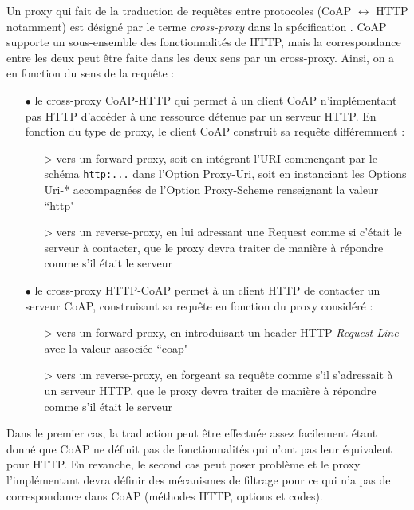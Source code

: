 \documentclass[]{report}
\begin{document}
\par Un proxy qui fait de la traduction de requêtes entre protocoles (CoAP $\leftrightarrow$ HTTP notamment) est désigné par le terme \textit{cross-proxy} dans la spécification \cite{rfc7252}. CoAP supporte un sous-ensemble des fonctionnalités de HTTP, mais la correspondance entre les deux peut être faite dans les deux sens par un cross-proxy. Ainsi, on a en fonction du sens de la requête :
\vspace{0.2cm}
\begin{itemize}
\item[$\bullet$] le cross-proxy CoAP-HTTP qui permet à un client CoAP n'implémentant pas HTTP d'accéder à une ressource détenue par un serveur HTTP. En fonction du type de proxy, le client CoAP construit sa requête différemment :
	\begin{itemize}
	\item[$\triangleright$] vers un forward-proxy, soit en intégrant l'URI commençant par le schéma \texttt{http:...} dans l'Option Proxy-Uri, soit en instanciant les Options Uri-* accompagnées de l'Option Proxy-Scheme renseignant la valeur ``http"
	\item[$\triangleright$] vers un reverse-proxy, en lui adressant une Request comme si c'était le serveur à contacter, que le proxy devra traiter de manière à répondre comme s'il était le serveur	
	\end{itemize}	 
\vspace{0.1cm}
\item[$\bullet$] le cross-proxy HTTP-CoAP permet à un client HTTP de contacter un serveur CoAP, construisant sa requête en fonction du proxy considéré :
	\begin{itemize}
	\item[$\triangleright$] vers un forward-proxy, en introduisant un header HTTP \textit{Request-Line} avec la valeur associée ``coap"
	\item[$\triangleright$] vers un reverse-proxy, en forgeant sa requête comme s'il s'adressait à un serveur HTTP, que le proxy devra traiter de manière à répondre comme s'il était le serveur
	\end{itemize}	 

\end{itemize}

\par Dans le premier cas, la traduction peut être effectuée assez facilement étant donné que CoAP ne définit pas de fonctionnalités qui n'ont pas leur équivalent pour HTTP. En revanche, le second cas peut poser problème et le proxy l'implémentant devra définir des mécanismes de filtrage pour ce qui n'a pas de correspondance dans CoAP (méthodes HTTP, options et codes).
\end{document}
